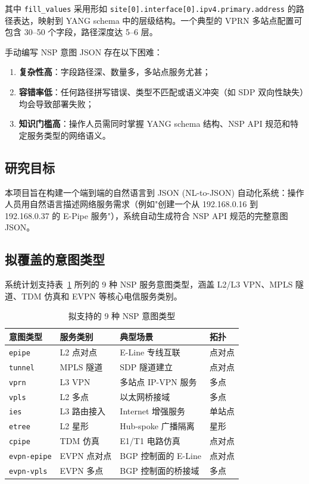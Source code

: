 \documentclass[12pt, a4paper]{article}
\newcommand{\intenttype}[1]{\texttt{#1}}
\newcommand{\yang}{\textsc{YANG}}
\newcommand{\nsp}{\textsc{NSP}}
\newcommand{\fillvalues}{\texttt{fill\_values}}
\begin{document}
\noindent
其中 \fillvalues{} 采用形如 \texttt{site[0].interface[0].ipv4.primary.address} 的路径表达，映射到 \yang{} schema 中的层级结构。一个典型的 VPRN 多站点配置可包含 30--50 个字段，路径深度达 5--6 层。

手动编写 \nsp{} 意图 JSON 存在以下困难：

\begin{enumerate}
  \item \textbf{复杂性高}：字段路径深、数量多，多站点服务尤甚；
  \item \textbf{容错率低}：任何路径拼写错误、类型不匹配或语义冲突（如 SDP 双向性缺失）均会导致部署失败；
  \item \textbf{知识门槛高}：操作人员需同时掌握 \yang{} schema 结构、\nsp{} API 规范和特定服务类型的网络语义。
\end{enumerate}

\subsection{研究目标}

本项目旨在构建一个端到端的自然语言到 JSON (NL-to-JSON) 自动化系统：操作人员用自然语言描述网络服务需求（例如"创建一个从 192.168.0.16 到 192.168.0.37 的 E-Pipe 服务"），系统自动生成符合 \nsp{} API 规范的完整意图 JSON。

\subsection{拟覆盖的意图类型}

系统计划支持表~\ref{tab:intent-types} 所列的 9 种 \nsp{} 服务意图类型，涵盖 L2/L3 VPN、MPLS 隧道、TDM 仿真和 EVPN 等核心电信服务类别。

\begin{table}[H]
\centering
\caption{拟支持的 9 种 NSP 意图类型}
\label{tab:intent-types}
\small
\begin{tabular}{llll}
\toprule
\textbf{意图类型} & \textbf{服务类别} & \textbf{典型场景} & \textbf{拓扑} \\
\midrule
\intenttype{epipe}       & L2 点对点     & E-Line 专线互联         & 点对点 \\
\intenttype{tunnel}      & MPLS 隧道     & SDP 隧道建立            & 点对点 \\
\intenttype{vprn}        & L3 VPN        & 多站点 IP-VPN 服务      & 多点 \\
\intenttype{vpls}        & L2 多点       & 以太网桥接域            & 多点 \\
\intenttype{ies}         & L3 路由接入   & Internet 增强服务       & 单站点 \\
\intenttype{etree}       & L2 星形       & Hub-spoke 广播隔离      & 星形 \\
\intenttype{cpipe}       & TDM 仿真      & E1/T1 电路仿真          & 点对点 \\
\intenttype{evpn-epipe}  & EVPN 点对点   & BGP 控制面的 E-Line     & 点对点 \\
\intenttype{evpn-vpls}   & EVPN 多点     & BGP 控制面的桥接域      & 多点 \\
\bottomrule
\end{tabular}
\end{table}
\end{document}
